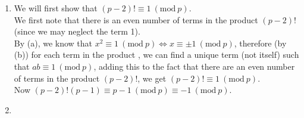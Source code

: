 \documentclass[11pt]{article}
\newcommand{\Mod}[1]{\ (\mathrm{mod}\ #1)}
\begin{document}
\begin{enumerate}
{\begin{enumerate}
{\begin{enumerate}
\end{enumerate}}
\item We will first show that $(p-2)! \equiv 1 \Mod{p}$.\\
We first note that there is an even number of terms in the product $(p-2)!$ (since we may neglect the term 1). 
\\By (a), we know that $x^2 \equiv 1 \Mod{p} \Leftrightarrow x \equiv \pm 1 \Mod{p}$, therefore (by (b)) for each term in the product , we can find a unique term (not itself) such that $ab \equiv 1\Mod{p}$, adding this to the fact that there are an even number of terms in the product $(p-2)!$, we get $(p-2)! \equiv 1 \Mod{p}$.
\\ Now $(p-2)!(p-1) \equiv p-1 \Mod{p} \equiv -1 \Mod{p}$. 
\item{\begin{enumerate}



\end{enumerate}}
\end{enumerate}}
\end{enumerate}
\end{document}
